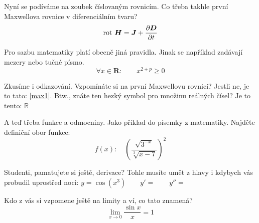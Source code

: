 \documentclass[12pt,a4paper,oneside]{article}
\numberwithin{equation}{section} %
\numberwithin{figure}{section} %
\numberwithin{table}{section} %
\renewcommand{\vec}[1]{\mbox{\boldmath$#1$}} %
\newcommand{\rot}{\mathrm{rot}\ }
\begin{document}
Nyní se podíváme na zoubek číslovaným rovnicím. Co třeba takhle první Maxwellova rovnice v diferenciálním tvaru?
\begin{equation} \label{max1} %
\rot\vec{H}=\vec{J}+\dfrac{\partial \vec{D}}{\partial t}
\end{equation}

Pro sazbu matematiky platí obecně jiná pravidla. Jinak se například zadávají mezery nebo tučné písmo.
\begin{equation}
\forall x \in \mathbf{R}: \qquad x^{2+p} \geq 0
\end{equation}

Zkusíme i odkazování. Vzpomínáte si na první Maxwellovu rovnici? Jestli ne, je to tato: \ref{max1}. Btw., znáte ten hezký symbol pro množinu reálných čísel? Je to tento: $\mathbb{R}$

A teď třeba funkce a odmocniny. Jako příklad do písemky z matematiky. Najděte definiční obor funkce:
\begin{equation}
f(x):\quad\left(\dfrac{\sqrt{3^{-x}}}{\sqrt[3]{x-7}}\right)^2
\end{equation} 

Studenti, pamatujete si ještě, derivace? Tohle musíte umět z hlavy i kdybych vás probudil uprostřed noci: $y=\cos(x^3)\qquad y'= \qquad y''=$

Kdo z vás si vzpomene ještě na limity a ví, co tato znamená?
\begin{displaymath}
\lim_{x \rightarrow 0} \frac{\sin x}{x} = 1
\end{displaymath}
\end{document}

